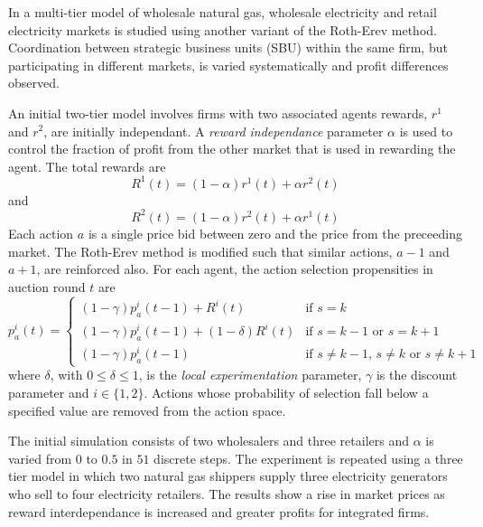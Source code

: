 In \cite{micola:08} a multi-tier model of wholesale natural gas, wholesale
electricity and retail electricity markets is studied using another variant of
the Roth-Erev method.  Coordination between strategic business units (SBU)
within the same firm, but participating in different markets, is varied
systematically and profit differences observed.

An initial two-tier model involves firms with two associated agents rewards,
$r^1$ and $r^2$, are initially independant.  A \textit{reward independance}
parameter $\alpha$ is used to control the fraction of profit from the other
market that is used in rewarding the agent.  The total rewards are
\begin{equation}
R^1(t) = (1-\alpha)r^1(t) + \alpha r^2(t)
\end{equation}
and
\begin{equation}
R^2(t) = (1-\alpha)r^2(t) + \alpha r^1(t)
\end{equation}
Each action $a$ is a single price bid between zero and the price from the
preceeding market.  The Roth-Erev method is modified such that similar
actions, $a-1$ and $a+1$, are reinforced also.  For each agent, the action
selection propensities in auction round $t$ are
\begin{equation}
p^i_a(t) = \begin{cases}
(1-\gamma)p^i_a(t-1) + R^i(t)& \text{if $s=k$}\\
(1-\gamma)p^i_a(t-1) + (1-\delta)R^i(t)& \text{if $s=k-1$ or $s=k+1$}\\
(1-\gamma)p^i_a(t-1)& \text{if $s\neq k-1$, $s\neq k$ or $s\neq k+1$}
\end{cases}
\end{equation}
where $\delta$, with $0\leq \delta \leq 1$, is the \textit{local
experimentation} parameter, $\gamma$ is the discount parameter and $i\in \lbrace
1,2 \rbrace$.  Actions whose probability of selection fall below a specified
value are removed from the action space.

The initial simulation consists of two wholesalers and three retailers and
$\alpha$ is varied from $0$ to $0.5$ in $51$ discrete steps.  The experiment
is repeated using a three tier model in which two natural gas shippers supply
three electricity generators who sell to four electricity retailers.  The
results show a rise in market prices as reward interdependance is increased and
greater profits for integrated firms.

